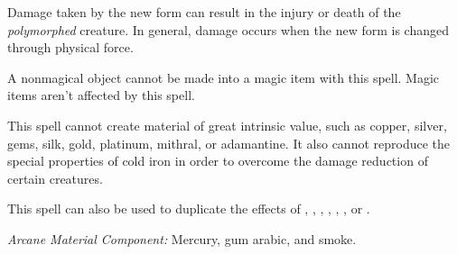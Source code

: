 {	Damage taken by the new form can result in the injury or death of the \emph{polymorphed} creature. In general, damage occurs when the new form is changed through physical force.

	A nonmagical object cannot be made into a magic item with this spell. Magic items aren't affected by this spell.

	This spell cannot create material of great intrinsic value, such as copper, silver, gems, silk, gold, platinum, mithral, or adamantine. It also cannot reproduce the special properties of cold iron in order to overcome the damage reduction of certain creatures.

	This spell can also be used to duplicate the effects of , , , , , , or .

	\textit{Arcane Material Component:}
	Mercury, gum arabic, and smoke.

}
